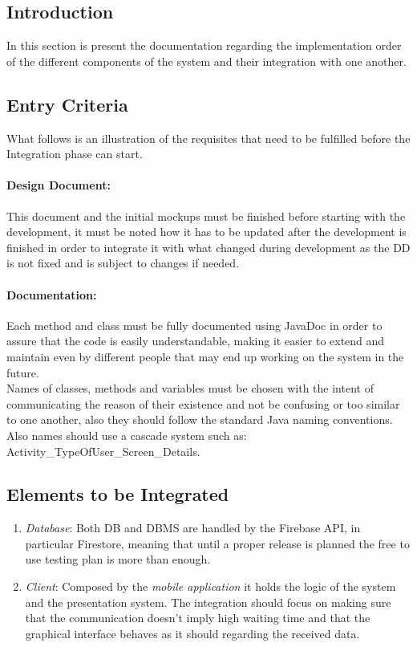 \subsection{Introduction}
In this section is present the documentation regarding the implementation order of the different components of the system and their integration with one another.
\subsection{Entry Criteria}
What follows is an illustration of the requisites that need to be fulfilled before the Integration phase can start.
\paragraph*{Design Document:\\} This document and the initial mockups must be finished before starting with the development, it must be noted how it has to be updated after the development is finished in order to integrate it with what changed during development as the DD is not fixed and is subject to changes if needed.
\paragraph*{Documentation:\\} Each method and class must be fully documented using JavaDoc in order to assure that the code is easily understandable, making it easier to extend and maintain even by different people that may end up working on the system in the future.\\
Names of classes, methods and variables must be chosen with the intent of communicating the reason of their existence and not be confusing or too similar to one another, also they should follow the standard Java naming conventions.\\
Also names should use a cascade system such as: Activity\_TypeOfUser\_Screen\_Details.
\subsection{Elements to be Integrated}
\begin{enumerate}
\item \emph{Database}: Both DB and DBMS are handled by the Firebase API, in particular Firestore, meaning that until a proper release is planned the free to use testing plan is more than enough.
\item \emph{Client}: Composed by the \emph{mobile application} it holds the logic of the system and the presentation system.
The integration should focus on making sure that the communication doesn't imply high waiting time and that the graphical interface behaves as it should regarding the received data.
\end{enumerate}
